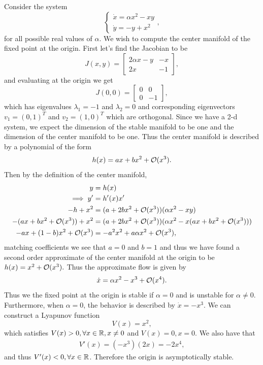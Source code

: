 \documentclass[12pt]{report}
\begin{document}
\begin{solution}

    \noindent
    Consider the system 
    \begin{equation}
        \left\{\begin{array}{l}
        \dot x= \alpha x^2 -xy \\
        \dot y = -y + x^2 
        \end{array}\right.,
    \end{equation}
    for all possible real values of $\alpha$. We wish to compute the center manifold of the fixed point at the origin. First let's find the Jacobian to be
    \[ 
        J(x,y) = \begin{bmatrix}
            2\alpha x - y & -x\\
            2x & -1
        \end{bmatrix},
    \]
    and evaluating at the origin we get
    \[ 
        J(0,0) = \begin{bmatrix}
            0 & 0\\
            0 & -1
        \end{bmatrix},
    \] 
    which has eigenvalues $\lambda_1 = -1$ and $\lambda_2 = 0$ and corresponding eigenvectors $v_1 = (0,1)^T$ and $v_2 = (1,0)^T$ which are orthogonal. Since we have a 2-d system, we expect the dimension of the stable manifold to be one and the dimension of the center manifold to be one. Thus the center manifold is described by a polynomial of the form
    \[ 
        h(x) = ax + bx^2 + {\mathcal{O}}(x^3).
    \] 
    Then by the definition of the center manifold,
    \begin{align*}
        y &= h(x)\\
        \implies y' &= h'(x)x'\\
        -h + x^2 &= (a + 2bx^2 + {\mathcal{O}}(x^3))(\alpha x^2 - xy)\\
        -(ax + bx^2 + {\mathcal{O}}(x^3)) + x^2 &= (a + 2bx^2 + {\mathcal{O}}(x^3))(\alpha x^2 - x(ax + bx^2 + {\mathcal{O}}(x^3)))\\
        -ax + (1-b)x^2 + {\mathcal{O}}(x^3) &= -a^2 x^2+a \alpha  x^2 + {\mathcal{O}}(x^3),\\
    \end{align*}
    matching coefficients we see that $a = 0$ and $b = 1$ and thus we have found a second order approximate of the center manifold at the origin to be $h(x) = x^2 + {\mathcal{O}}(x^3).$ Thus the approximate flow is given by
    \[ 
        \dot x = \alpha x^2 - x^3 + {\mathcal{O}}(x^4).
    \]
    Thus we the fixed point at the origin is stable if $\alpha = 0$ and is unstable for $\alpha \neq 0$. Furthermore, when $\alpha = 0$, the behavior is described by $\dot x = -x^3$. We can construct a Lyapunov function
    \[ 
        V(x) = x^2,
    \]
    which satisfies $V(x) >0, \forall x \in {\mathbb R}, x \neq 0$ and $V(x) = 0, x =0$. We also have that 
    \begin{align*}
        V'(x) = (-x^3)(2x) = -2x^4,
    \end{align*}
    and thus $V'(x) < 0, \forall x \in {\mathbb R}$. Therefore the origin is asymptotically stable. 


\end{solution}
\end{document}
